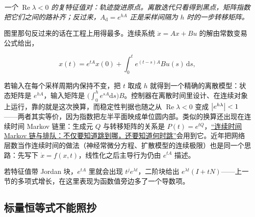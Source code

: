 \begin{center}

\emph{一个 \(\operatorname{Re}\lambda<0\) 的复特征值对：轨迹旋进原点。离散迭代只看得到黑点，矩阵指数把它们之间的路补齐；反过来，\(A_{\mathrm d}=e^{hA}\) 正是采样间隔为 \(h\) 时的一步转移矩阵。}
\end{center}

图里那句反过来的话在工程上用得最多。连续系统 \(\dot x=Ax+Bu\) 的解由常数变易公式给出，

\[
x(t)=e^{tA}x(0)+\int_0^t e^{(t-s)A}Bu(s)\,\mathrm ds,
\]

若输入在每个采样周期内保持不变，把 \(t\) 取成 \(h\) 就得到一个精确的离散模型：状态矩阵是 \(e^{hA}\)，输入矩阵是 \(\bigl(\int_0^h e^{sA}\mathrm ds\bigr)B\)。控制器在离散时间里设计、在连续对象上运行，靠的就是这次换算，而稳定性判据也随之从 \(\operatorname{Re}\lambda<0\) 变成 \(\left|e^{h\lambda}\right|<1\)——两者其实等价，因为指数把左半平面映成单位圆内部。类似的换算还出现在连续时间 Markov 链里：生成元 \(Q\) 与转移矩阵的关系是 \(P(t)=e^{tQ}\)，\hyperref[ch:050]{``连续时间 Markov 链与排队：不仅要知道跳到哪，还要知道何时跳''}会用到它。近年把网络层数当作连续时间的做法（神经常微分方程、扩散模型的连续极限）也是同一个思路：先写下 \(\dot x=f(x,t)\)，线性化之后主导行为仍由 \(e^{tA}\) 描述。

若特征值带 Jordan 块，\(e^{tA}\) 里就会出现 \(t^je^{\lambda t}\)，二阶块给出 \(e^{\lambda t}(I+tN)\)——上一节的多项式增长，在这里表现为函数值旁边多了一个导数项。

\subsection{标量恒等式不能照抄}

